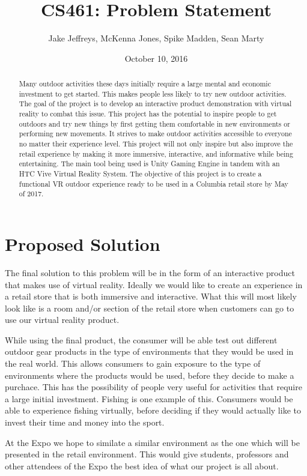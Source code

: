\documentclass[letterpaper,10pt,titlepage]{article}
\title{CS461: Problem Statement}
\author{Jake Jeffreys, McKenna Jones, Spike Madden, Sean Marty}
\date{October 10, 2016}
\begin{document}
\begin{titlepage}
\maketitle
\begin{abstract}
Many outdoor activities these days initially require a large mental and economic
investment to get started. This makes people less likely to try new outdoor
activities. The goal of the project is to develop an interactive product
demonstration with virtual reality to combat this issue. This project has the
potential to inspire people to get outdoors and try new things by first getting
them comfortable in new environments or performing new movements. It strives to
make outdoor activities accessible to everyone no matter their experience level.
This project will not only inspire but also improve the retail experience by
making it more immersive, interactive, and informative while being
entertaining. The main tool being used is Unity Gaming Engine in tandem with an
HTC Vive Virtual Reality System. The objective of this project is to create a
functional VR outdoor experience ready to be used in a Columbia retail store by
May of 2017.
\end{abstract}
\end{titlepage}

\section{Proposed Solution}
The final solution to this problem will be in the form of an interactive product that makes use of virtual reality. Ideally we would like to create an experience in a retail store that is both immersive and interactive. What this will most likely look like is a room and/or section of the retail store when customers can go to use our virtual reality product.

While using the final product, the consumer will be able test out different outdoor gear products in the type of environments that they would be used in the real world. This allows consumers to gain exposure to the type of environments where the products would be used, before they decide to make a purchace. This has the possibility of people very useful for activities that require a large initial investment. Fishing is one example of this. Consumers would be able to experience fishing virtually, before deciding if they would actually like to invest their time and money into the sport.

At the Expo we hope to similate a similar environment as the one which will be presented in the retail environment. This would give students, professors and other attendees of the Expo the best idea of what our project is all about.
\end{document}
